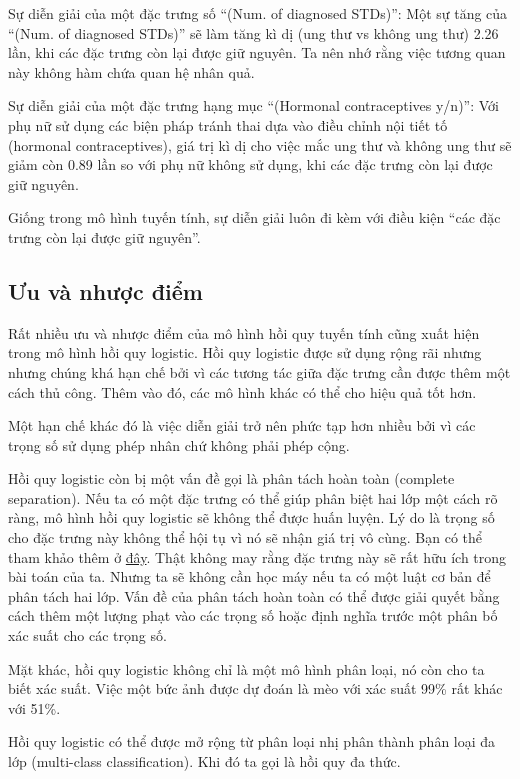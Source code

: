 Sự diễn giải của một đặc trưng số ``(Num. of diagnosed STDs)'': Một sự tăng của ``(Num. of diagnosed STDs)'' sẽ làm tăng kì dị (ung thư vs không ung thư) 2.26 lần, khi các đặc trưng còn lại được giữ nguyên. Ta nên nhớ rằng việc tương quan này không hàm chứa quan hệ nhân quả.

Sự diễn giải của một đặc trưng hạng mục ``(Hormonal contraceptives y/n)'': Với phụ nữ sử dụng các biện pháp tránh thai dựa vào điều chỉnh nội tiết tố (hormonal contraceptives), giá trị kì dị cho việc mắc ung thư và không ung thư sẽ giảm còn 0.89 lần so với phụ nữ không sử dụng, khi các đặc trưng còn lại được giữ nguyên.

Giống trong mô hình tuyến tính, sự diễn giải luôn đi kèm với điều kiện ``các đặc trưng còn lại được giữ nguyên''.

\subsection{Ưu và nhược điểm}

Rất nhiều ưu và nhược điểm của mô hình hồi quy tuyến tính cũng xuất hiện trong mô hình hồi quy logistic. Hồi quy logistic được sử dụng rộng rãi nhưng nhưng chúng khá hạn chế bởi vì các tương tác giữa đặc trưng cần được thêm một cách thủ công. Thêm vào đó, các mô hình khác có thể cho hiệu quả tốt hơn.

Một hạn chế khác đó là việc diễn giải trở nên phức tạp hơn nhiều bởi vì các trọng số sử dụng phép nhân chứ không phải phép cộng.

Hồi quy logistic còn bị một vấn đề gọi là phân tách hoàn toàn (complete separation). Nếu ta có một đặc trưng có thể giúp phân biệt hai lớp một cách rõ ràng, mô hình hồi quy logistic sẽ không thể được huấn luyện. Lý do là trọng số cho đặc trưng này không thể hội tụ vì nó sẽ nhận giá trị vô cùng. Bạn có thể tham khảo thêm ở \href{https://github.com/luulinh90s/InterpretableMLBook-Vietnamese/issues/8}{đây}. Thật không may rằng đặc trưng này sẽ rất hữu ích trong bài toán của ta. Nhưng ta sẽ không cần học máy nếu ta có một luật cơ bản để phân tách hai lớp. Vấn đề của phân tách hoàn toàn có thể được giải quyết bằng cách thêm một lượng phạt vào các trọng số hoặc định nghĩa trước một phân bố xác suất cho các trọng số.

Mặt khác, hồi quy logistic không chỉ là một mô hình phân loại, nó còn cho ta biết xác suất. Việc một bức ảnh được dự đoán là mèo với xác suất 99\% rất khác với 51\%.

Hồi quy logistic có thể được mở rộng từ phân loại nhị phân thành phân loại đa lớp (multi-class classification). Khi đó ta gọi là hồi quy đa thức. 

